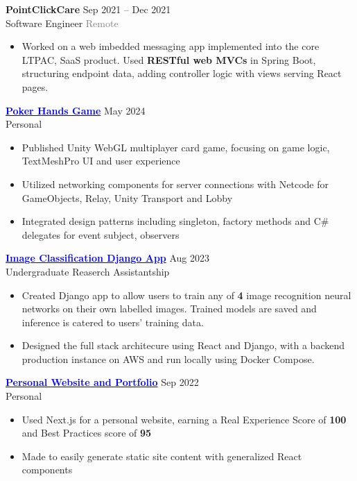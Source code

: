 \documentclass[10pt]{developercv} %
\begin{document}
\begin{minipage}[t]{\textwidth}
	\textbf{PointClickCare} \hfill Sep 2021 -- Dec 2021 \\
	Software Engineer \hfill \textcolor{gray}{Remote}
	\begin{itemize}[noitemsep,topsep=0pt]
		\item Worked on a web imbedded messaging app implemented into the core LTPAC, SaaS product.
		Used \textbf{RESTful web MVCs} in Spring Boot, structuring endpoint data,
		adding controller logic with views serving React pages.
	\end{itemize}
\end{minipage}


\begin{minipage}[t]{\textwidth}
	\vspace{-\baselineskip}
	\textbf{\href{https://henryhu.dev/pokerbsgame/index.html}{\textcolor{blue}{Poker Hands Game}}} \hfill May 2024 \\
	Personal
	\begin{itemize}[noitemsep,topsep=0pt]
		\item Published Unity WebGL multiplayer card game, focusing on game logic, TextMeshPro UI and user experience
		\item Utilized networking components for server connections with Netcode for GameObjects, Relay, Unity Transport and Lobby
		\item Integrated design patterns including singleton, factory methods and C\# delegates for event subject, observers
	\end{itemize}
	\vspace{0.3em}

	\textbf{\href{https://uclassify.henryhu.dev}{\textcolor{blue}{Image Classification Django App}}} \hfill Aug 2023\\
	Undergraduate Reaserch Assistantship
	\begin{itemize}[noitemsep,topsep=0pt]
		\item Created Django app to allow users to train any of \textbf{4} image recognition neural networks on
		their own labelled images. Trained models are saved and inference is catered to users'
		training data.
		\item Designed the full stack architecure using React and Django, with a backend production instance on AWS and run locally using Docker Compose.
	\end{itemize}
	\vspace{0.3em}

	\textbf{\href{https://henryhu.dev}{\textcolor{blue}{Personal Website and Portfolio}}} \hfill Sep 2022\\
	Personal
	\begin{itemize}[noitemsep,topsep=0pt]
		\item Used Next.js for a personal website, earning a Real Experience Score of \textbf{100} and Best Practices score of \textbf{95}
		\item Made to easily generate static site content with generalized React components
	\end{itemize}
	\vspace{0.3em}


\end{minipage}
\end{document}
